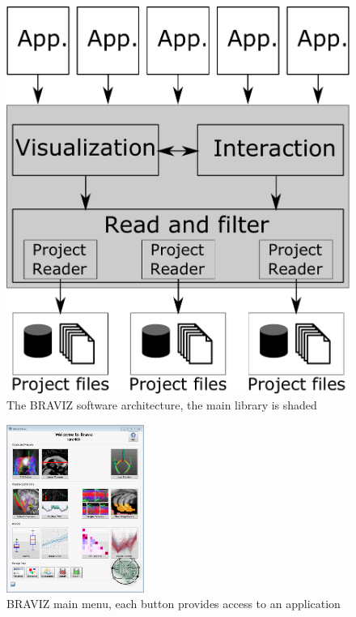 \documentclass{frontiersHLTH}
\begin{document}
\begin{figure}[p]
\begin{center}
\includegraphics[width=0.6\linewidth]{arquitecture.pdf}
\end{center}
 \caption{\label{fig_arch} The BRAVIZ software architecture, the main library is shaded}
\end{figure}

\begin{figure}
\begin{center}
\includegraphics[width=0.4\textwidth]{braviz_menu}
\end{center}
 \caption{\label{fig_menu} BRAVIZ main menu, each button provides access to an application }
\end{figure}
\end{document}
